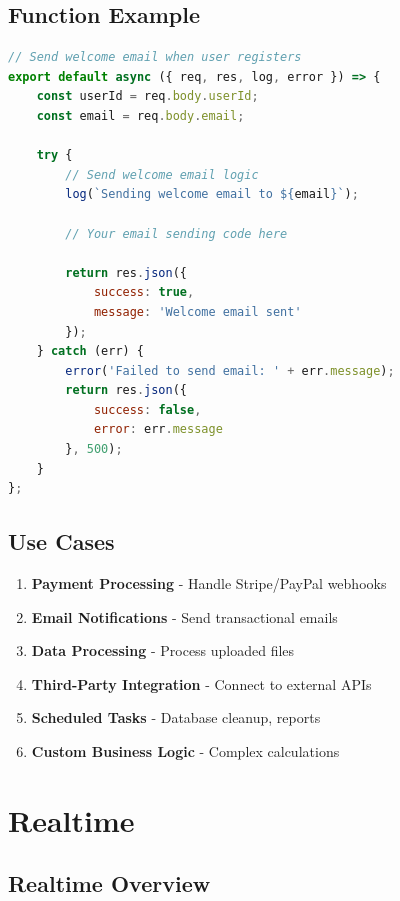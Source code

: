 \documentclass[11pt,a4paper,oneside]{book}
\begin{document}
\section{Function Example}

\begin{lstlisting}[language=JavaScript, caption=Node.js Function Example]
// Send welcome email when user registers
export default async ({ req, res, log, error }) => {
    const userId = req.body.userId;
    const email = req.body.email;
    
    try {
        // Send welcome email logic
        log(`Sending welcome email to ${email}`);
        
        // Your email sending code here
        
        return res.json({
            success: true,
            message: 'Welcome email sent'
        });
    } catch (err) {
        error('Failed to send email: ' + err.message);
        return res.json({
            success: false,
            error: err.message
        }, 500);
    }
};
\end{lstlisting}

\section{Use Cases}

\begin{enumerate}
    \item \textbf{Payment Processing} - Handle Stripe/PayPal webhooks
    \item \textbf{Email Notifications} - Send transactional emails
    \item \textbf{Data Processing} - Process uploaded files
    \item \textbf{Third-Party Integration} - Connect to external APIs
    \item \textbf{Scheduled Tasks} - Database cleanup, reports
    \item \textbf{Custom Business Logic} - Complex calculations
\end{enumerate}

\chapter{Realtime}

\section{Realtime Overview}
\end{document}
